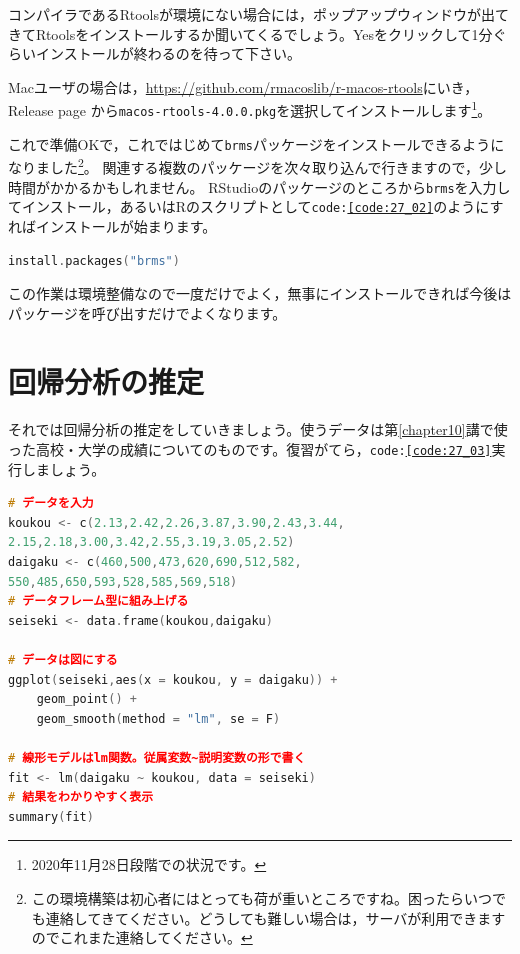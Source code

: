 \documentclass{ltjsarticle}
\begin{document}
コンパイラであるRtoolsが環境にない場合には，ポップアップウィンドウが出てきてRtoolsをインストールするか聞いてくるでしょう。Yesをクリックして1分ぐらいインストールが終わるのを待って下さい。

Macユーザの場合は，\url{https://github.com/rmacoslib/r-macos-rtools}にいき，Release page から\texttt{macos-rtools-4.0.0.pkg}を選択してインストールします\footnote{2020年11月28日段階での状況です。}。

これで準備OKで，これではじめて\texttt{brms}パッケージをインストールできるようになりました\footnote{この環境構築は初心者にはとっても荷が重いところですね。困ったらいつでも連絡してきてください。どうしても難しい場合は，サーバが利用できますのでこれまた連絡してください。}。
関連する複数のパッケージを次々取り込んで行きますので，少し時間がかかるかもしれません。
RStudioのパッケージのところから\texttt{brms}を入力してインストール，あるいはRのスクリプトとして\texttt{code:\ref{code:27_02}}のようにすればインストールが始まります。

\begin{lstlisting}[language=c++,label={code:27_02},caption={パッケージを入れる}]
install.packages("brms")
\end{lstlisting}

この作業は環境整備なので一度だけでよく，無事にインストールできれば今後はパッケージを呼び出すだけでよくなります。
\section{回帰分析の推定}
それでは回帰分析の推定をしていきましょう。使うデータは第\ref{chapter10}講で使った高校・大学の成績についてのものです。復習がてら，\texttt{code:\ref{code:27_03}}実行しましょう。
\begin{lstlisting}[language=c++,label={code:27_03},caption={回帰分析をやってみる}]
# データを入力
koukou <- c(2.13,2.42,2.26,3.87,3.90,2.43,3.44,
2.15,2.18,3.00,3.42,2.55,3.19,3.05,2.52)
daigaku <- c(460,500,473,620,690,512,582,
550,485,650,593,528,585,569,518)
# データフレーム型に組み上げる
seiseki <- data.frame(koukou,daigaku)

# データは図にする
ggplot(seiseki,aes(x = koukou, y = daigaku)) +
    geom_point() +
    geom_smooth(method = "lm", se = F)

# 線形モデルはlm関数。従属変数~説明変数の形で書く
fit <- lm(daigaku ~ koukou, data = seiseki)
# 結果をわかりやすく表示
summary(fit)
\end{lstlisting}
\end{document}
